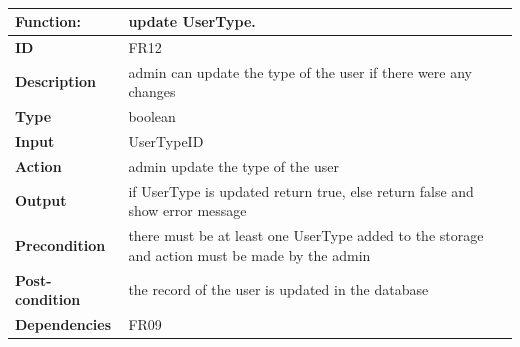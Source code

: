 \documentclass[]{article}
\begin{document}
\FloatBarrier
\begin{table}[h]
\caption{}
\label{tab:my-table}
\begin{tabular}{|p{}|p{}|}
\hline
\textbf{Function:} & update UserType.
\\ \hline
\textbf{ID}  & FR12           

\\ \hline
\textbf{Description}    & admin can update the type of the user if there were any changes                                                                  
\\ \hline
\textbf{Type}    & boolean  

\\ \hline
\textbf{Input}        & UserTypeID


\\ \hline
\textbf{Action}            & admin update the type of the user

\\ \hline
\textbf{Output}            & if UserType is updated return true, else return false and show error message

\\ \hline
\textbf{Precondition}           & there must be at least one UserType added to the storage and action must be made by the admin 

\\ \hline
\textbf{Post-condition}           & the record of the user is updated in the database


\\ \hline
\textbf{Dependencies}           & FR09
\\ \hline
\end{tabular}
\end{table}
\end{document}
